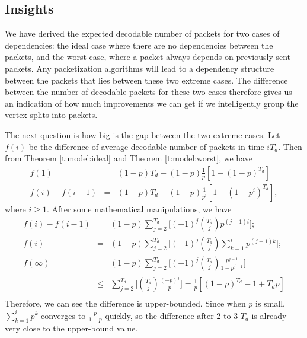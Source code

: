 \subsection{Insights}
    We have derived the expected decodable number of packets for
    two cases of dependencies: the ideal case where there are no
    dependencies between the packets, and the worst case, where
    a packet always depends on previously sent packets.  Any
    packetization algorithms will lead to a
    dependency structure between the packets that lies between
    these two extreme cases.  The difference between the number of
    decodable packets for these two cases therefore gives us an
    indication of how much improvements we can get if we intelligently
    group the vertex splits into packets.  
    
    The next question is how big is the
    gap between the two extreme cases.
    Let $f(i)$ be the difference of average decodable number of packets in time $iT_d$. Then
    from Theorem \ref{t:model:ideal} and Theorem \ref{t:model:worst}, we have
    \begin{eqnarray*}
    f(1)         &=& (1-p)T_d - (1-p)\frac{1}{p}[1-(1-p)^{T_d}]\\
        f(i)-f(i-1)  &=& (1-p)T_d - (1-p)\frac{1}{p^i}[1-(1-p^i)^{T_d}],
    \end{eqnarray*}
    where $i \geq 1$. After some mathematical manipulations, we have
    \begin{eqnarray*}
    f(i) - f(i-1) &=& (1-p)\sum_{j=2}^{T_d}\Big[(-1)^j\binom{T_d}{j}p^{(j-1)i}\Big];\\
    f(i)          &=& (1-p)\sum_{j=2}^{T_d}\Big[(-1)^{j}\binom{T_d}{j}\sum_{k=1}^i p^{(j - 1)k}\Big];\\
    f(\infty)     &=& (1-p)\sum_{j=2}^{T_d}\Big[(-1)^{j}\binom{T_d}{j}\frac{p^{j-1}}{1-p^{j-1}}\Big]\\
                  &\leq& \sum_{j=2}^{T_d}\Big[\binom{T_d}{j}\frac{(-p)^{j}}{p}\Big] = \frac{1}{p}[(1-p)^{T_d} -1 + T_{d}p]\\
    \end{eqnarray*}
    Therefore, we can see the difference is upper-bounded.
    Since when $p$ is small, $\sum_{k=1}^i p^k$ converges to $\frac{p}{1-p}$ quickly,
    so the difference after 2 to 3 $T_d$ is already very close to the upper-bound value.
    
